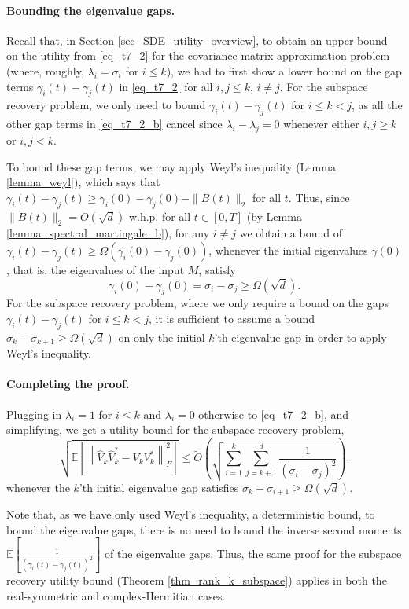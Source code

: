 \documentclass[11pt,letterpaper]{article}
\begin{document}
\paragraph{Bounding the eigenvalue gaps.} Recall that, in Section \ref{sec_SDE_utility_overview}, to obtain an upper bound on the utility from \eqref{eq_t7_2} for the covariance matrix approximation problem (where, roughly, $\lambda_i = \sigma_i$ for $i\leq k$), we had to first show a lower bound on the gap terms  $\gamma_i(t) - \gamma_j(t)$ in \eqref{eq_t7_2} for all $i,j \leq k$, $i \neq j$.
%
For the subspace recovery problem, we only need to bound $\gamma_i(t) - \gamma_j(t)$ for $i\leq k<j$, as all the other gap terms in \eqref{eq_t7_2_b} cancel since $\lambda_i - \lambda_j = 0$ whenever either $i,j \geq k$ or $i,j < k$.


To bound these gap terms, we may apply Weyl's inequality (Lemma \ref{lemma_weyl}), which says that $\gamma_i(t) - \gamma_j(t) \geq \gamma_i(0) - \gamma_j(0) - \|B(t)\|_2$ for all $t$.
%
Thus, since $\|B(t)\|_2 = O(\sqrt{d})$ w.h.p. for all $t\in [0,T]$ (by Lemma \ref{lemma_spectral_martingale_b}), for any $i \neq j$ we obtain a bound of  $\gamma_i(t) - \gamma_j(t) \geq \Omega(\gamma_i(0) - \gamma_j(0))$, whenever the initial eigenvalues $\gamma(0)$, that is, the eigenvalues of the input $M$, satisfy  $$\gamma_i(0) - \gamma_j(0) = \sigma_i - \sigma_j \geq \Omega(\sqrt{d}).$$
%
For the subspace recovery problem, where we only require a bound on the gaps  $\gamma_i(t) - \gamma_j(t)$ for $i\leq k<j$, it is sufficient to assume a bound $\sigma_{k} - \sigma_{k+1} \geq \Omega(\sqrt{d})$ on only the initial $k$'th eigenvalue gap in order to apply Weyl's inequality.
%

\paragraph{Completing the proof. } Plugging in $\lambda_i = 1$ for $i \leq k$ and $\lambda_i = 0$ otherwise to \eqref{eq_t7_2_b}, and simplifying, we get a utility bound for the subspace recovery problem, 
$$ 
\sqrt{\mathbb{E}\left[\left\|\hat{V}_k\hat{V}_k^\ast -  V_k V_k^\ast \right \|_F^2\right]} \leq \tilde{O}\left(\sqrt{\sum_{i=1}^k \sum_{j= k+1}^d \frac{1}{(\sigma_i - \sigma_j)^2}}\right).
$$
%
whenever the $k$'th initial eigenvalue gap satisfies $\sigma_k - \sigma_{i+1} \geq \Omega(\sqrt{d})$.


Note that, as we have only used Weyl's inequality, a deterministic bound, to bound the eigenvalue gaps, there is no need to bound the inverse second moments $\mathbb{E}\left[\frac{1}{(\gamma_i(t) - \gamma_j(t))^2}\right]$ of the eigenvalue gaps.
%
Thus, the same proof for the subspace recovery utility bound (Theorem \ref{thm_rank_k_subspace}) applies in both the real-symmetric and complex-Hermitian cases.
\end{document}
